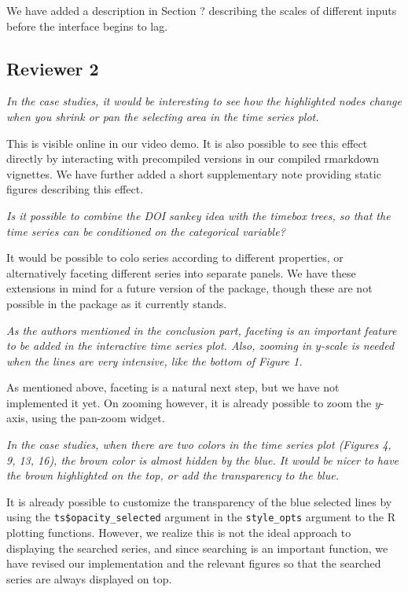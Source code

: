 \documentclass{article}
\begin{document}
We have added a description in Section ? describing the scales of different
inputs before the interface begins to lag.

\subsection{Reviewer 2}

\textit{In the case studies, it would be interesting to see how the highlighted
  nodes change when you shrink or pan the selecting area in the time series
  plot.}

This is visible online in our video demo. It is also possible to see this effect
directly by interacting with precompiled versions in our compiled rmarkdown
vignettes. We have further added a short supplementary note providing static
figures describing this effect.

\textit{Is it possible to combine the DOI sankey idea with the timebox trees, so
  that the time series can be conditioned on the categorical variable?}

It would be possible to colo series according to different properties, or
alternatively faceting different series into separate panels. We have these
extensions in mind for a future version of the package, though these are not
possible in the package as it currently stands.

\textit{As the authors mentioned in the conclusion part, faceting is an
  important feature to be added in the interactive time series plot. Also,
  zooming in $y$-scale is needed when the lines are very intensive, like the
  bottom of Figure 1.}

As mentioned above, faceting is a natural next step, but we have not implemented
it yet. On zooming however, it is already possible to zoom the $y$-axis, using
the pan-zoom widget.

\textit{In the case studies, when there are two colors in the time series plot
  (Figures 4, 9, 13, 16), the brown color is almost hidden by the blue. It would
  be nicer to have the brown highlighted on the top, or add the transparency to
  the blue.}

It is already possible to customize the transparency of the blue selected lines
by using the \texttt{ts\$opacity\_selected} argument in the \texttt{style\_opts}
argument to the R plotting functions. However, we realize this is not the ideal
approach to displaying the searched series, and since searching is an important
function, we have revised our implementation and the relevant figures so that
the searched series are always displayed on top.
\end{document}
